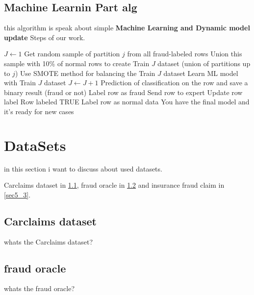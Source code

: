 \documentclass[preprint,12pt]{elsarticle}
\begin{document}
\subsection{Machine Learnin Part alg}
\label{sec4_4}

this algorithm is speak about simple \textbf{Machine Learning and Dynamic model update} Steps of our work.
\begin{algorithm}
	\caption{Machine Learnin}\label{algo:machinelearning}
	\begin{algorithmic}
		\STATE $J \gets 1$
		\STATE Get random sample of partition $j$ from all fraud-labeled rows
		\STATE Union this sample with 10\% of normal rows to create Train $J$ dataset (union of partitions up to $j$)
		\STATE Use SMOTE method for balancing the Train $J$ dataset
		\STATE Learn ML model with Train $J$ dataset
		\ENDFOR
		\STATE $J \gets J + 1$
		\STATE Prediction of classification on the row and save a binary result (fraud or not)
		\ENDFOR
		\STATE Label row as fraud
		\STATE Send row to expert
		\STATE Update row label
		\ELSE
		\STATE Row labeled TRUE
		\ENDIF
		\ELSE
		\STATE Label row as normal data
		\ENDIF
		\ENDFOR
		\ENDWHILE
		\STATE You have the final model and it's ready for new cases
	\end{algorithmic}
\end{algorithm}


\section{DataSets}
\label{sec5}
in this section i want to discuss about used datasets.

Carclaims dataset in \ref{sec5_1},
fraud oracle  in \ref{sec5_2} and
insurance fraud claim in \ref{sec5_3}.


\subsection{Carclaims dataset}
\label{sec5_1}
whats the  Carclaims dataset?


\subsection{fraud oracle}
\label{sec5_2}
whats the  fraud oracle?
\end{document}
